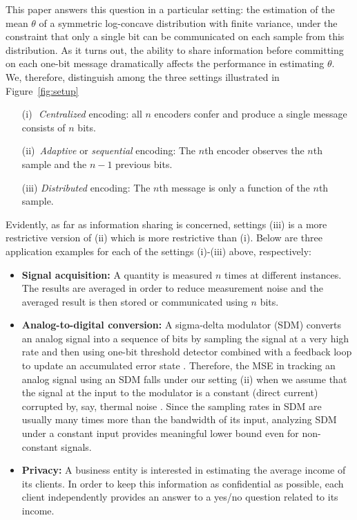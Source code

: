 \documentclass[letterpaper, 11pt]{IEEEtran}      %
\begin{document}
This paper answers this question in a particular setting: the estimation of the mean $\theta$ of a symmetric log-concave distribution with finite variance, under the constraint that only a single bit can be communicated on each sample from this distribution. As it turns out, the ability to share information before committing on each one-bit message dramatically affects the performance in estimating $\theta$. We, therefore, distinguish among the three settings illustrated in Figure~\ref{fig:setup}
\begin{itemize}
 \item[(i)\,\,] \emph{Centralized} encoding: all $n$ encoders confer and produce a single message consists of $n$ bits.
 \item[(ii)\,] \emph{Adaptive} or \emph{sequential} encoding: The $n$th encoder observes the $n$th sample and the $n-1$ previous bits.
 \item[(iii)] \emph{Distributed} encoding: The $n$th message is only a function of the $n$th sample.
 \end{itemize}
Evidently, as far as information sharing is concerned, settings (iii) is a more restrictive version of (ii) which is more restrictive than (i). Below are three application examples for each of the settings (i)-(iii) above, respectively:
\begin{itemize}
\item {\bf Signal acquisition:} A quantity is measured $n$ times at different instances. The results are averaged in order to reduce measurement noise and the averaged result is then stored or communicated using $n$ bits. 
\item {\bf Analog-to-digital conversion:} A sigma-delta modulator (SDM) converts an analog signal into a sequence of bits by sampling the signal at a very high rate and then using one-bit threshold detector combined with a feedback loop to update an accumulated error state \cite{1092194}. Therefore, the MSE in tracking an analog signal using an SDM falls under our setting (ii) when we assume that the signal at the input to the modulator is a constant (direct current) corrupted by, say, thermal noise \cite{53738}. Since the sampling rates in SDM are usually many times more than the bandwidth of its input, analyzing SDM under a constant input provides meaningful lower bound even for non-constant signals.
\item {\bf Privacy:} A business entity is interested in estimating the average income of its clients. In order to keep this information as confidential as possible, each client independently provides an answer to a yes/no question related to its income.
\end{itemize}
\end{document}
